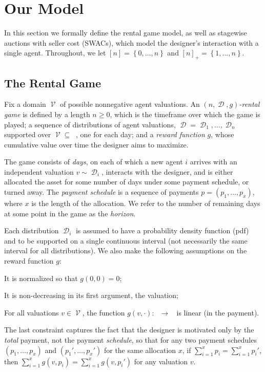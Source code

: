 \documentclass[11pt,letterpaper]{article}
\newcommand{\set}[1]{\left\{#1\right\}}
\newcommand{\swacs}{SWACs\xspace}
\newcommand{\reals}{\mathbb{R}}
\DeclareMathOperator{\preals}{\reals_{\geq0}}
\newcommand{\psqrrange}[1]{[#1]_+}
\newcommand{\sqrrange}[1]{[#1]}
\DeclareMathOperator{\D}{\mathcal{D}}
\DeclareMathOperator{\V}{\mathcal{V}}
\newcommand{\g}{g}
\theoremstyle{plain}
\begin{document}
\section{Our Model}\label{sec:model}

In this section we formally define the rental game model,
as well as stagewise auctions with seller cost (\swacs), which model the designer's interaction with a single agent. 
Throughout,
we let $\sqrrange{n} =\set{0,\ldots,n}$ and $\psqrrange{n} = \set{1,\ldots,n}$. 

\subsection{The Rental Game}\label{subsec:rental}

Fix a domain $\V$ of possible nonnegative agent valuations.
An \emph{$(n, \boldsymbol{\D}, \g)$-rental game}
is defined by a length $n \geq 0$, which is the timeframe over which the game is played;
a sequence of distributions
of agent valuations,
$\boldsymbol{\D} = \D_1,\ldots,\D_n$ supported over $\V\subseteq\preals$, one for each day; 
and a \emph{reward function} $\g$,
whose cumulative value over time the designer aims to maximize.



The game consists of \emph{days},
on each of which a new agent $i$ arrives with an independent valuation $v \sim \D_i$, interacts with the designer, and is either allocated the asset for some number of days under some payment schedule, or turned away.
The \emph{payment schedule}
is a sequence of payments
$p = (p_1,\ldots,p_x)$,
where $x$ is the length of the allocation.
We refer to the number of remaining days at some point in the game as the \emph{horizon}.

Each distribution $\D_i$ is assumed to have a probability density function (pdf) and to be supported on a single continuous interval (not necessarily the same interval for all distributions).
We also make the following assumptions on the reward function $g$:
\begin{enumerate*}
    \item It is normalized so that $g(0,0) = 0$;
    \item It is non-decreasing in its first argument, the valuation;
    \item For all valuations $v \in \V$,
    the function $g(v, \cdot) : \preals \rightarrow \preals$ is linear (in the payment).
\end{enumerate*}
The last constraint captures the fact that the designer is motivated only by the \emph{total} payment,
not the payment \emph{schedule},
so that for any two payment schedules $(p_1,\ldots,p_x)$ and $(p_1', \ldots, p_{x}')$ for the same allocation $x$,
if $\sum_{i = 1}^x p_i = \sum_{i = 1}^{x} p_i'$,
then $\sum_{i = 1}^x g(v, p_i) = \sum_{i = 1}^{x} g(v, p_i')$ for any valuation $v$.
\end{document}
